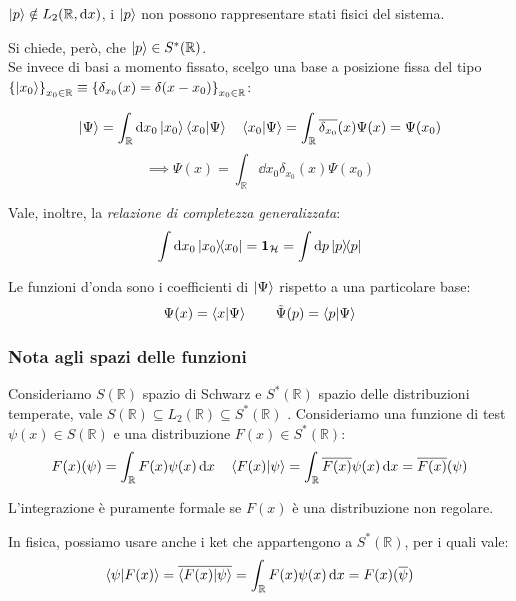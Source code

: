 \begin{attention}
    \(\ket{p} \notin L_2(\mathbb{R},\dd{x})\), i \(\ket{p}\) non possono rappresentare stati fisici del sistema.
\end{attention}

Si chiede, però,  che \(\ket{p} \in S^*(\mathbb{R})\).\\
Se invece di basi a momento fissato, scelgo una base a posizione fissa del tipo 
\(\left\{ \ket{x_0} \right\}_{x_0 \in\mathbb{R}}\equiv \left\{\delta_{x_0}(x)= \delta(x-x_0)\right\}_{x_0 \in \mathbb{R}}\):

\begin{equation*}
    \ket{\Psi}= \int_\mathbb{R}\dd{x_0} \ket{x_0}\braket{x_0}{\Psi} \quad   
    \braket{x_0}{\Psi} = \int_\mathbb{R} \overline{\delta_{x_0}}(x) \Psi(x)= \Psi(x_0)
\end{equation*}
\begin{equation}
    \implies \Psi(x)= \int_\mathbb{R} \dd{x_0} \delta_{x_0}(x)\Psi(x_0)
\end{equation}

Vale, inoltre, la \textit{relazione di completezza generalizzata}: 
\begin{equation}
    \int \dd{x_0} \dyad{x_0}{x_0}= \mathbf{1}_\mathcal{H} = \int \dd{p} \dyad{p}{p}
\end{equation}

Le funzioni d'onda sono i coefficienti di \(\ket{\Psi}\) rispetto a una particolare base:
\begin{equation}
    \Psi(x)= \braket{x}{\Psi} \qquad \tilde{\Psi}(p) = \braket{p}{\Psi}
\end{equation}


\subsubsection{Nota agli spazi delle funzioni}
Consideriamo \(S(\mathbb{R})\) spazio di Schwarz e \(S^*(\mathbb{R})\) spazio delle distribuzioni temperate,
vale \(S(\mathbb{R})\subseteq L_2(\mathbb{R})\subseteq S^*(\mathbb{R})\) .
Consideriamo una funzione di test \(\psi(x) \in S(\mathbb{R})\) e una distribuzione \(F(x) \in S^*(\mathbb{R})\):
\[
    F(x)(\psi) = \int_\mathbb{R} F(x) \psi(x) \dd{x} \quad \braket{F(x)}{\psi} = \int_\mathbb{R}\overline{F(x)} \psi(x) \dd{x} = \overline{F(x)} (\psi)
\]
\begin{attention}
    L'integrazione è puramente formale se \(F(x)\) è una distribuzione non regolare.
\end{attention}
In fisica, possiamo usare anche i ket che appartengono a \(S^*(\mathbb{R})\), per i quali vale:
\[
    \braket{\psi}{F(x)}= \overline{\braket{F(x)}{\psi}} = \int_\mathbb{R} F(x) \psi (x) \dd{x} = F(x) (\overline{\psi})
\]

